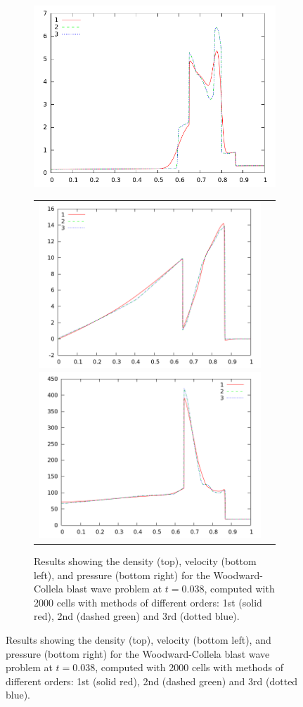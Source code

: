 \documentclass[10pt]{article}
\begin{document}
\begin{figure}[h]
\begin{figure}[h]
  \begin{center}
     \includegraphics[width=.95\textwidth]{den_T12_2000.png}
	\begin{tabular}{cc}
     \includegraphics[width=.475\textwidth]{vel_T12_2000.png}
     \includegraphics[width=.475\textwidth]{prs_T12_2000.png}	
    \end{tabular}	
  \end{center}
  \caption{Results showing the density (top), velocity (bottom left), and pressure (bottom right) for the Woodward-Collela blast wave problem at $t=0.038$, computed with 2000 cells with methods of different orders: 1st (solid red), 2nd (dashed green) and 3rd (dotted blue).}
  \label{fig:den_T12_2000}
\end{figure}



\end{figure}
\end{document}
